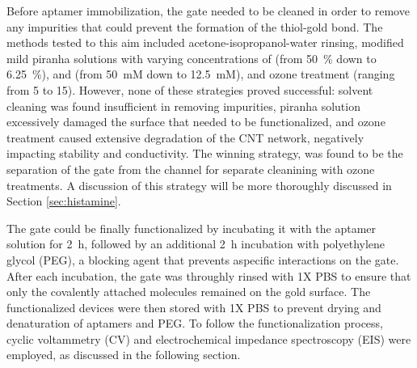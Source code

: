 Before aptamer immobilization, the gate needed to be cleaned in order to remove
any impurities that could prevent the formation of the thiol-gold bond. The
methods tested to this aim included acetone-isopropanol-water rinsing, modified
mild piranha solutions with varying concentrations of  (from
\SI{50}{\%} down to \SI{6.25}{\%}), and  (from \SI{50}{mM} down to
\SI{12.5}{mM}), and ozone treatment (ranging from \SI{5}{\min} to
\SI{15}{\min}). However, none of these strategies proved successful: solvent
cleaning was found insufficient in removing impurities, piranha solution
excessively damaged the surface that needed to be functionalized, and ozone
treatment caused extensive degradation of the CNT network, negatively impacting
stability and conductivity. The winning strategy, was found to be the separation
of the gate from the channel for separate cleanining with ozone treatments. A
discussion of this strategy will be more thoroughly discussed in Section
\ref{sec:histamine}.

The gate could be finally functionalized by incubating it with the aptamer
solution for \SI{2}{\hour}, followed by an additional \SI{2}{\hour} incubation
with polyethylene glycol (PEG), a blocking agent that prevents aspecific
interactions on the gate. After each incubation, the gate was throughly rinsed
with 1X PBS to ensure that only the covalently attached molecules remained on
the gold surface. The functionalized devices were then stored with 1X PBS to
prevent drying and denaturation of aptamers and PEG. To follow the
functionalization process, cyclic voltammetry (CV) and electrochemical impedance
spectroscopy (EIS) were employed, as discussed in the following section.

